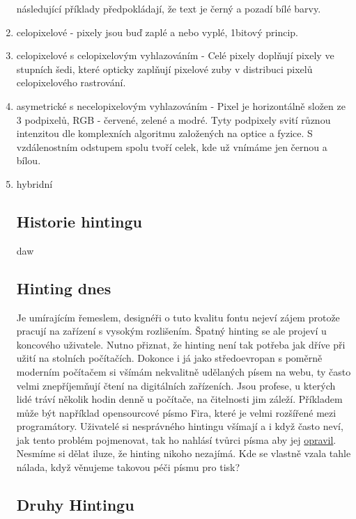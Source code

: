 \documentclass[a4paper]{article}
\begin{document}
\begin{enumerate}
následující příklady předpokládají, že text je černý a pozadí bílé barvy.
\item celopixelové - pixely jsou buď zaplé a nebo vyplé, 1bitový princip.

\item celopixelové s celopixelovým vyhlazováním - Celé pixely doplňují pixely ve stupních šedi, které opticky zaplňují pixelové zuby v distribuci pixelů celopixelového rastrování.

\item asymetrické s necelopixelovým vyhlazováním - Pixel je horizontálně složen ze 3 podpixelů, RGB - červené, zelené a modré. Tyty podpixely svití různou intenzitou dle komplexních algoritmu založených na optice a fyzice. S vzdálenostním odstupem spolu tvoří celek, kde už vnímáme jen černou a bílou. 

\item hybridní 

\subsection{Historie hintingu}
daw

\subsection{Hinting dnes}

Je umírajícím řemeslem, designéři o tuto kvalitu fontu nejeví zájem protože pracují na zařízení s vysokým rozlišením. Špatný hinting se ale projeví u koncového uživatele. Nutno přiznat, že hinting není tak potřeba jak dříve při užití na stolních počítačích. Dokonce i já jako středoevropan s poměrně moderním počítačem si všímám nekvalitně udělaných písem na webu, ty často velmi znepříjemňují čtení na digitálních zařízeních. Jsou profese, u kterých lidé tráví několik hodin denně u počítače, na čitelnosti jim záleží. Příkladem může být například opensourcové písmo Fira, které je velmi rozšířené mezi programátory. Uživatelé si nesprávného hintingu všímají a i když často neví, jak tento problém pojmenovat, tak ho nahlásí tvůrci písma aby jej \href{https://github.com/tonsky/FiraCode/issues?utf8=%E2%9C%93&q=hinting}{opravil}. Nesmíme si dělat iluze, že hinting nikoho nezajímá. Kde se vlastně vzala tahle nálada, když věnujeme takovou péči písmu pro tisk?


\subsection{Druhy Hintingu}


\end{enumerate}
\end{document}
